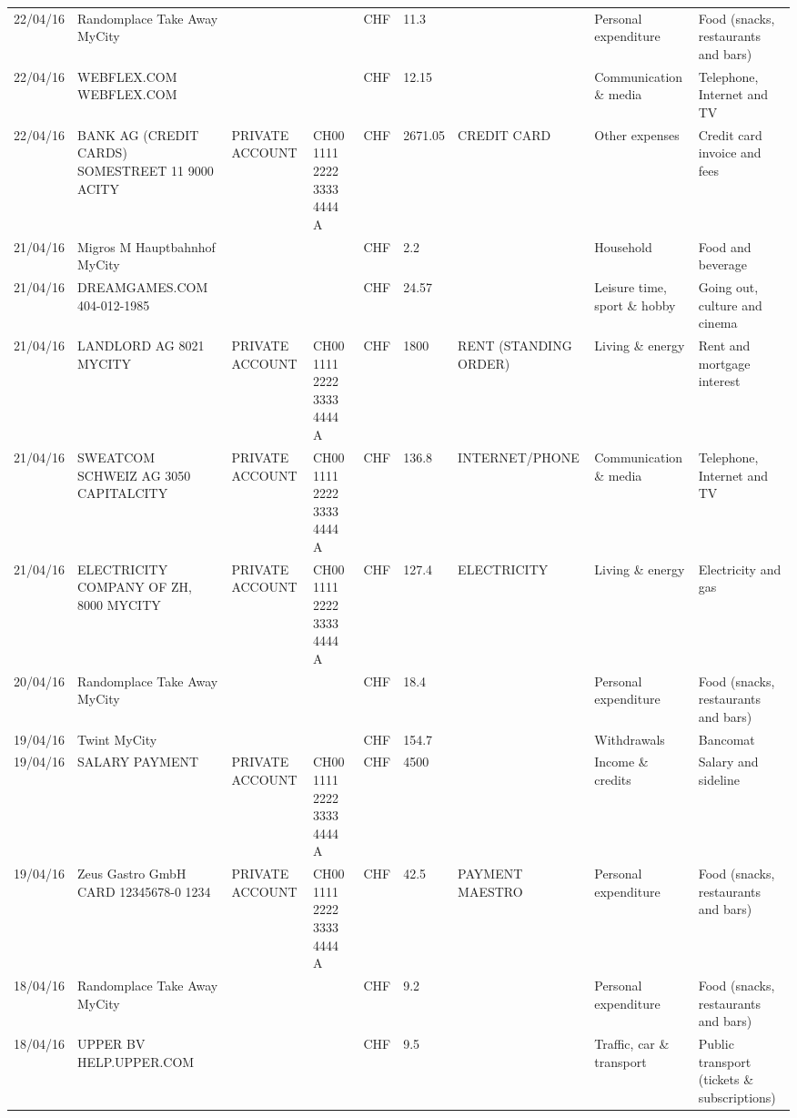\begin{landscape}
\begin{adjustwidth}{-2cm}{-2cm}
\begin{tiny}
\begin{longtable}{lp{4cm}llllp{3cm}ll}
		22/04/16 & Randomplace Take Away     MyCity &       &       & CHF   & 11.3  &       & Personal expenditure & Food (snacks, restaurants and bars) \\
		22/04/16 & WEBFLEX.COM              WEBFLEX.COM &       &       & CHF   & 12.15 &       & Communication \& media & Telephone,  Internet and TV \\
		22/04/16 & BANK AG (CREDIT CARDS) SOMESTREET 11 9000 ACITY & PRIVATE ACCOUNT & CH00 1111 2222 3333 4444 A & CHF   & 2671.05 & CREDIT CARD & Other expenses & Credit card invoice and fees \\
		21/04/16 & Migros M Hauptbahnhof    MyCity &       &       & CHF   & 2.2   &       & Household & Food and beverage \\
		21/04/16 & DREAMGAMES.COM           404-012-1985 &       &       & CHF   & 24.57 &       & Leisure time, sport \& hobby & Going out, culture and cinema \\
		21/04/16 & LANDLORD AG 8021 MYCITY & PRIVATE ACCOUNT & CH00 1111 2222 3333 4444 A & CHF   & 1800  & RENT (STANDING ORDER) & Living \& energy & Rent and mortgage interest \\
		21/04/16 & SWEATCOM SCHWEIZ AG 3050 CAPITALCITY & PRIVATE ACCOUNT & CH00 1111 2222 3333 4444 A & CHF   & 136.8 & INTERNET/PHONE & Communication \& media & Telephone,  Internet and TV \\
		21/04/16 & ELECTRICITY COMPANY OF ZH, 8000 MYCITY & PRIVATE ACCOUNT & CH00 1111 2222 3333 4444 A & CHF   & 127.4 & ELECTRICITY & Living \& energy & Electricity and gas \\
		20/04/16 & Randomplace Take Away     MyCity &       &       & CHF   & 18.4  &       & Personal expenditure & Food (snacks, restaurants and bars) \\
		19/04/16 & Twint               MyCity &       &       & CHF   & 154.7 &       & Withdrawals & Bancomat \\
		19/04/16 & SALARY PAYMENT & PRIVATE ACCOUNT & CH00 1111 2222 3333 4444 A & CHF   & 4500  &       & Income \& credits & Salary and sideline \\
		19/04/16 & Zeus Gastro GmbH CARD 12345678-0 1234 & PRIVATE ACCOUNT & CH00 1111 2222 3333 4444 A & CHF   & 42.5  & PAYMENT MAESTRO & Personal expenditure & Food (snacks, restaurants and bars) \\
		18/04/16 & Randomplace Take Away     MyCity &       &       & CHF   & 9.2   &       & Personal expenditure & Food (snacks, restaurants and bars) \\
		18/04/16 & UPPER BV                  HELP.UPPER.COM &       &       & CHF   & 9.5   &       & Traffic, car \& transport & Public transport (tickets \& subscriptions) \\

\end{longtable}
\end{tiny}
\end{adjustwidth}
\end{landscape}
